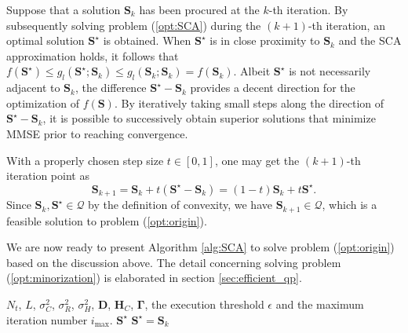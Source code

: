 \documentclass[lettersize,journal]{IEEEtran}
\begin{document}
Suppose that a solution $\mathbf{S}_k$ has been procured at the $k$-th iteration. By subsequently solving problem (\ref{opt:SCA}) during the $(k+1)$-th iteration, an optimal solution $\mathbf{S}^{\star}$ is obtained. When $\mathbf{S}^{\star}$ is in close proximity to $\mathbf{S}_k$ and the SCA approximation holds, it follows that $f(\mathbf{S}^{\star})\leq g_l(\mathbf{S}^{\star};\mathbf{S}_k)\leq g_l(\mathbf{S}_k;\mathbf{S}_k)=f(\mathbf{S}_k)$. Albeit $\mathbf{S}^{\star}$ is not necessarily adjacent to $\mathbf{S}_k$, the difference $\mathbf{S}^{\star}-\mathbf{S}_k$ provides a decent direction for the optimization of $f(\mathbf{S})$. By iteratively taking small steps along the direction of $\mathbf{S}^{\star}-\mathbf{S}_k$, it is possible to successively obtain superior solutions that minimize MMSE prior to reaching convergence.

With a properly chosen step size $t\in[0,1]$, one may get the $(k+1)$-th iteration point as
\begin{equation}
    \mathbf{S}_{k+1}=\mathbf{S}_k+t(\mathbf{S}^{\star}-\mathbf{S}_k)=(1-t)\mathbf{S}_k+t\mathbf{S}^{\star}.
\end{equation}
Since $\mathbf{S}_k,\mathbf{S}^{\star} \in \mathcal{Q}$ by the definition of convexity, we have $\mathbf{S}_{k+1} \in \mathcal{Q}$, which is a feasible solution to problem (\ref{opt:origin}).

We are now ready to present Algorithm \ref{alg:SCA} to solve problem (\ref{opt:origin})  based on the discussion above. The detail concerning solving problem (\ref{opt:minorization}) is elaborated in section \ref{sec:efficient_qp}.
\begin{algorithm}
\caption{SCA Method for Solving (\ref{opt:origin})}
\label{alg:SCA}
\begin{algorithmic}[1]
    \REQUIRE $N_t$, $L$, $\sigma_C^2$, $\sigma_R^2$, $\sigma_H^2$, $\mathbf{D}$, $\mathbf{H}_C$, $\mathbf{\Gamma}$, the execution threshold $\epsilon$ and the maximum iteration number $i_{\max}$.
    \ENSURE $\mathbf{S}^{\star}$
    \STATE $\mathbf{S}^{\star}=\mathbf{S}_k$
\end{algorithmic}
\end{algorithm}
\end{document}
